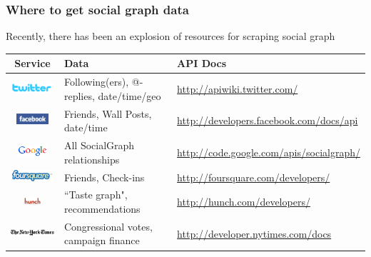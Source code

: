 \documentclass[xcolor=dvipsnames, 9pt]{beamer}
\begin{document}
\begin{frame}[fragile]
    \frametitle{Where to get social graph data}
    Recently, there has been an explosion of resources for scraping social graph
    \begin{table}
        \centering
        \scriptsize{
        \begin{tabular*}{.99\textwidth}{c|l|l}
        Service & Data & API Docs \\ \hline \hline
        \includegraphics[height=4mm]{../images/twitter_logo.png} & Following(ers), @-replies, date/time/geo & \url{http://apiwiki.twitter.com/} \\ \hline
        \includegraphics[height=4mm]{../images/facebook_logo.jpg} & Friends, Wall Posts, date/time & \url{http://developers.facebook.com/docs/api} \\ \hline
        \includegraphics[height=4mm]{../images/Newgooglelogo.png} & All SocialGraph relationships & \url{http://code.google.com/apis/socialgraph/} \\ \hline
        \includegraphics[height=4mm]{../images/foursquare.png} & Friends, Check-ins & \url{http://foursquare.com/developers/} \\ \hline
        \includegraphics[height=3mm]{../images/Hunch_com_logo.png} & ``Taste graph", recommendations  & \url{http://hunch.com/developers/} \\ \hline
        \includegraphics[height=4mm]{../images/nytlogo.png} & Congressional votes, campaign finance & \url{http://developer.nytimes.com/docs}
        \end{tabular*}}
    \end{table}
\end{frame}
\end{document}
